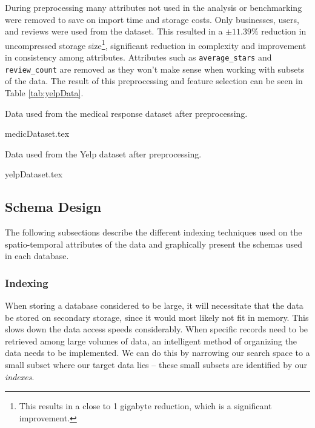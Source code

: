 During preprocessing many attributes not used in the analysis or benchmarking were removed to save on import time and storage costs. Only businesses, users, and reviews were used from the dataset. This resulted in a $\pm11.39\%$ reduction in uncompressed storage size\footnote{This results in a close to 1 gigabyte reduction, which is a significant improvement.}, significant reduction in complexity and improvement in consistency among attributes. Attributes such as \texttt{average\_stars} and \texttt{review\_count} are removed as they won't make sense when working with subsets of the data. The result of this preprocessing and feature selection can be seen in Table \ref{tab:yelpData}.

\begin{table*}[h]
    \centering
    \small
    \caption{Data used from the medical response dataset after preprocessing.}
    \vspace*{5mm}
    {medicDataset.tex}
    \label{tab:simData}
\end{table*}

\begin{table*}[h]
    \centering
    \small
    \caption{Data used from the Yelp dataset after preprocessing.}
    \vspace*{5mm}
    {yelpDataset.tex}
    \label{tab:yelpData}
\end{table*}

\subsection{Schema Design}

The following subsections describe the different indexing techniques used on the spatio-temporal attributes of the data and graphically present the schemas used in each database.

\subsubsection{Indexing}
When storing a database considered to be large, it will necessitate that the data be stored on secondary storage, since it would most likely not fit in memory. This slows down the data access speeds considerably. When specific records need to be retrieved among large volumes of data, an intelligent method of organizing the data needs to be implemented. We can do this by narrowing our search space to a small subset where our target data lies -- these small subsets are identified by our \emph{indexes}.

